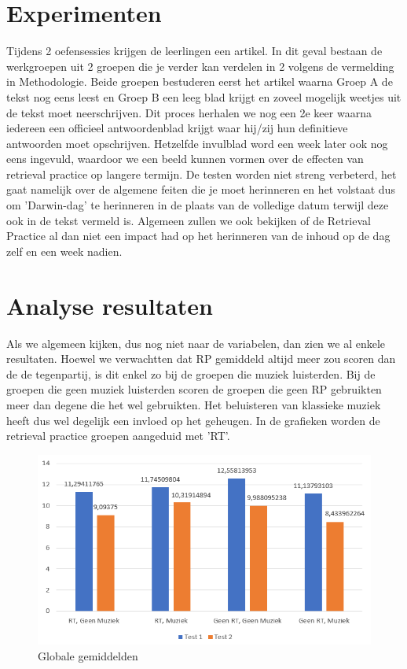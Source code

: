 \documentclass{hogent-article}
\begin{document}
	\section{Experimenten}
	Tijdens 2 oefensessies krijgen de leerlingen een artikel. In dit geval bestaan de werkgroepen uit 2 groepen die je verder kan verdelen in 2 volgens de vermelding in Methodologie. 
    Beide groepen bestuderen eerst het artikel waarna Groep A de tekst nog eens leest en Groep B een leeg blad krijgt en zoveel mogelijk weetjes uit de tekst moet neerschrijven. Dit proces herhalen we nog een 2e keer waarna iedereen een officieel antwoordenblad krijgt waar hij/zij hun definitieve antwoorden moet opschrijven. Hetzelfde invulblad word een week later ook nog eens ingevuld, waardoor we een beeld kunnen vormen over de effecten van retrieval practice op langere termijn.
	De testen worden niet streng verbeterd, het gaat namelijk over de algemene feiten die je moet herinneren en het volstaat dus om 'Darwin-dag' te herinneren in de plaats van de volledige datum terwijl deze ook in de tekst vermeld is. Algemeen zullen we ook bekijken of de Retrieval Practice al dan niet een impact had op het herinneren van de inhoud op de dag zelf en een week nadien.
	
	
	\section{Analyse resultaten}
	 Als we algemeen kijken, dus nog niet naar de variabelen, dan zien we al enkele resultaten. Hoewel we verwachtten dat RP gemiddeld altijd meer zou scoren dan de de tegenpartij, is dit enkel zo bij de groepen die muziek luisterden. Bij de groepen die geen muziek luisterden scoren de groepen die geen RP gebruikten meer dan degene die het wel gebruikten. Het beluisteren van klassieke muziek heeft dus wel degelijk een invloed op het geheugen.
     In de grafieken worden de retrieval practice groepen aangeduid met 'RT'.
	
	\begin{figure}[H]
		\includegraphics[width=\linewidth]{img/algemeen.png}
		\caption{Globale gemiddelden}
	\end{figure}
	
\end{document}

